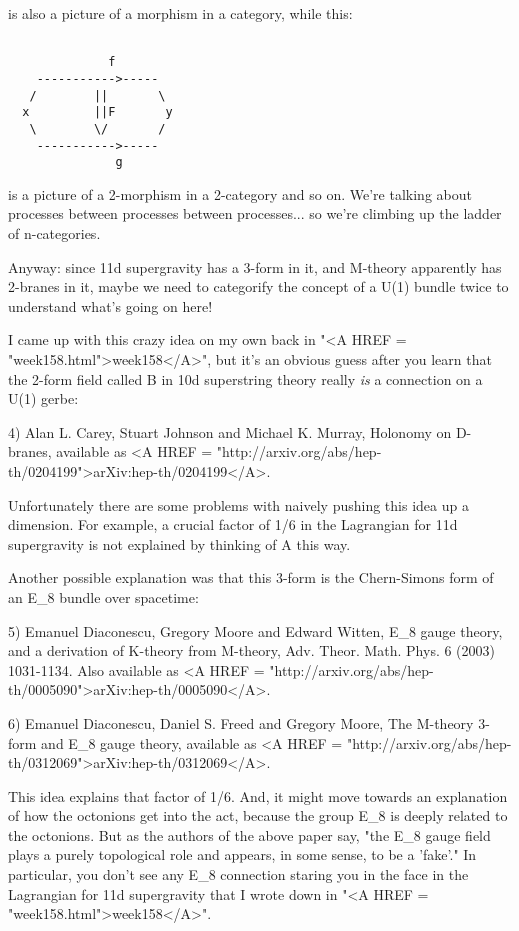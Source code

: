 is also a picture of a morphism in a category, while this:


\begin{verbatim}

              f
    ----------->-----
   /        ||       \
  x         ||F       y  
   \        \/       /  
    ----------->-----
               g
\end{verbatim}
    
is a picture of a 2-morphism in a 2-category and so on.  We're
talking about processes between processes between processes... 
so we're climbing up the ladder of n-categories.

Anyway: since 11d supergravity has a 3-form in it, and M-theory 
apparently has 2-branes in it, maybe we need to categorify 
the concept of a U(1) bundle twice to understand what's going
on here!

I came up with this crazy idea on my own back in "<A HREF =
"week158.html">week158</A>", but it's an obvious guess after you
learn that the 2-form field called B in 10d superstring theory really
\emph{is} a connection on a U(1) gerbe:

4) Alan L. Carey, Stuart Johnson and Michael K. Murray,
Holonomy on D-branes, available as <A HREF = "http://arxiv.org/abs/hep-th/0204199">arXiv:hep-th/0204199</A>.

Unfortunately there are some problems with naively pushing
this idea up a dimension.  For example, a crucial factor of 
1/6 in the Lagrangian for 11d supergravity is not explained 
by thinking of A this way.

Another possible explanation was that this 3-form is the 
Chern-Simons form of an E_{8} bundle over spacetime:

5) Emanuel Diaconescu, Gregory Moore and Edward Witten,
E_{8} gauge theory, and a derivation of K-theory from M-theory,
Adv. Theor. Math. Phys. 6 (2003) 1031-1134.  Also available as 
<A HREF = "http://arxiv.org/abs/hep-th/0005090">arXiv:hep-th/0005090</A>.

6) Emanuel Diaconescu, Daniel S. Freed and Gregory Moore,
The M-theory 3-form and E_{8} gauge theory, available as
<A HREF = "http://arxiv.org/abs/hep-th/0312069">arXiv:hep-th/0312069</A>.

This idea explains that factor of 1/6.  And, it might move towards an
explanation of how the octonions get into the act, because the group
E_{8} is deeply related to the octonions.  But as the authors
of the above paper say, "the E_{8} gauge field plays a
purely topological role and appears, in some sense, to be a
'fake'." In particular, you don't see any E_{8}
connection staring you in the face in the Lagrangian for 11d
supergravity that I wrote down in "<A HREF =
"week158.html">week158</A>".

